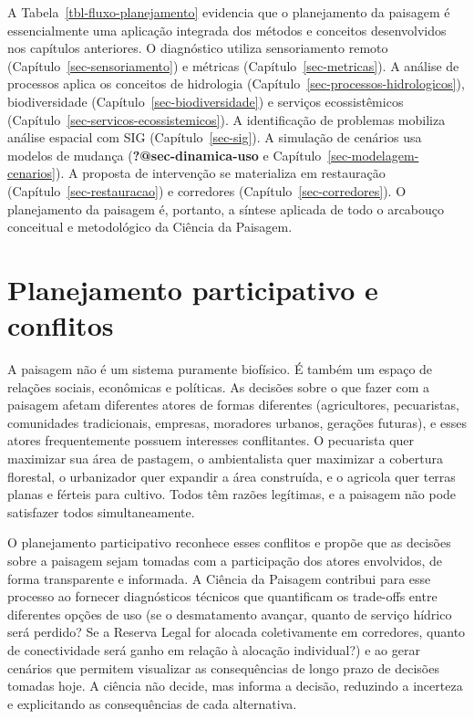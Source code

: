 \documentclass[
  portuguese,
  11pt,
  a4paper,
  open=any]{scrbook}
\begin{document}
A Tabela~\ref{tbl-fluxo-planejamento} evidencia que o planejamento da
paisagem é essencialmente uma aplicação integrada dos métodos e
conceitos desenvolvidos nos capítulos anteriores. O diagnóstico utiliza
sensoriamento remoto (Capítulo~\ref{sec-sensoriamento}) e métricas
(Capítulo~\ref{sec-metricas}). A análise de processos aplica os
conceitos de hidrologia (Capítulo~\ref{sec-processos-hidrologicos}),
biodiversidade (Capítulo~\ref{sec-biodiversidade}) e serviços
ecossistêmicos (Capítulo~\ref{sec-servicos-ecossistemicos}). A
identificação de problemas mobiliza análise espacial com SIG
(Capítulo~\ref{sec-sig}). A simulação de cenários usa modelos de mudança
(\textbf{?@sec-dinamica-uso} e Capítulo~\ref{sec-modelagem-cenarios}). A
proposta de intervenção se materializa em restauração
(Capítulo~\ref{sec-restauracao}) e corredores
(Capítulo~\ref{sec-corredores}). O planejamento da paisagem é, portanto,
a síntese aplicada de todo o arcabouço conceitual e metodológico da
Ciência da Paisagem.

\section{Planejamento participativo e
conflitos}\label{planejamento-participativo-e-conflitos}

A paisagem não é um sistema puramente biofísico. É também um espaço de
relações sociais, econômicas e políticas. As decisões sobre o que fazer
com a paisagem afetam diferentes atores de formas diferentes
(agricultores, pecuaristas, comunidades tradicionais, empresas,
moradores urbanos, gerações futuras), e esses atores frequentemente
possuem interesses conflitantes. O pecuarista quer maximizar sua área de
pastagem, o ambientalista quer maximizar a cobertura florestal, o
urbanizador quer expandir a área construída, e o agricola quer terras
planas e férteis para cultivo. Todos têm razões legítimas, e a paisagem
não pode satisfazer todos simultaneamente.

O planejamento participativo reconhece esses conflitos e propõe que as
decisões sobre a paisagem sejam tomadas com a participação dos atores
envolvidos, de forma transparente e informada. A Ciência da Paisagem
contribui para esse processo ao fornecer diagnósticos técnicos que
quantificam os trade-offs entre diferentes opções de uso (se o
desmatamento avançar, quanto de serviço hídrico será perdido? Se a
Reserva Legal for alocada coletivamente em corredores, quanto de
conectividade será ganho em relação à alocação individual?) e ao gerar
cenários que permitem visualizar as consequências de longo prazo de
decisões tomadas hoje. A ciência não decide, mas informa a decisão,
reduzindo a incerteza e explicitando as consequências de cada
alternativa.
\end{document}
